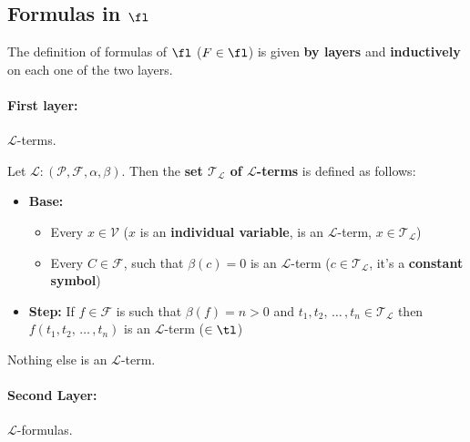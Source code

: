 \subsection{Formulas in $\fl$}
The definition of formulas of $\fl$ ($F \in \fl$) is given \textbf{by layers} and \textbf{inductively} on each one of the two layers.

\paragraph{First layer:} $\mathcal{L}$-terms.

\begin{definition}
	Let $\mathcal{L}: (\mathcal{P}, \mathcal{F}, \alpha, \beta)$. Then the \textbf{set $\mathcal{T}_\mathcal{L}$ of $\mathcal{L}$-terms} is defined as follows:
	\begin{itemize}
		\item \textbf{Base:}
		\begin{itemize}
			\item Every $x \in \mathcal{V}$ ($x$ is an \textbf{individual variable}, is an $\mathcal{L}$-term, $x \in \mathcal{T}_\mathcal{L}$)
			\item Every $C \in \mathcal{F}$, such that $\beta(c) = 0$ is an $\mathcal{L}$-term ($c \in \mathcal{T}_\mathcal{L}$, it's a \textbf{constant symbol})
		\end{itemize}
		\item \textbf{Step:} If $f \in \mathcal{F}$ is such that $\beta(f) = n > 0$ and $t_1, t_2, \, \dots \, , t_n \in \mathcal{T}_\mathcal{L}$ then $f(t_1, t_2, \, \dots \, , t_n)$ is an $\mathcal{L}$-term ($\in \tl$)
	\end{itemize}
	Nothing else is an $\mathcal{L}$-term.\\
\end{definition}

\paragraph{Second Layer:} $\mathcal{L}$-formulas.

